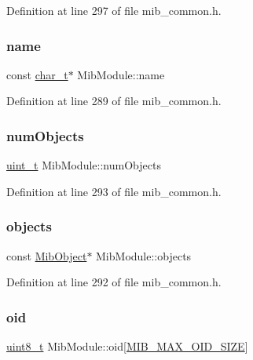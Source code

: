 Definition at line 297 of file mib\+\_\+common.\+h.

\mbox{\label{structMibModule_a2f457893adfb6a6711ac75cbaa55c9b1}} 
\subsubsection{\texorpdfstring{name}{name}}
{\footnotesize\ttfamily const \hyperlink{compiler__port_8h_a40bb5262bf908c328fbcfbe5d29d0201}{char\+\_\+t}$\ast$ Mib\+Module\+::name}



Definition at line 289 of file mib\+\_\+common.\+h.

\mbox{\label{structMibModule_ab9594c4a682ecd9c16c0986307dce4b3}} 
\subsubsection{\texorpdfstring{num\+Objects}{numObjects}}
{\footnotesize\ttfamily \hyperlink{compiler__port_8h_a12a1e9b3ce141648783a82445d02b58d}{uint\+\_\+t} Mib\+Module\+::num\+Objects}



Definition at line 293 of file mib\+\_\+common.\+h.

\mbox{\label{structMibModule_ab77b76e01f954ed88084409a966352aa}} 
\subsubsection{\texorpdfstring{objects}{objects}}
{\footnotesize\ttfamily const \hyperlink{mib__common_8h_a2bc33cee6dd90a0ee8eeb92976a1c479}{Mib\+Object}$\ast$ Mib\+Module\+::objects}



Definition at line 292 of file mib\+\_\+common.\+h.

\mbox{\label{structMibModule_af5a55e711701cdec4f0cb9edc7c2b5a4}} 
\subsubsection{\texorpdfstring{oid}{oid}}
{\footnotesize\ttfamily \hyperlink{stdint_8h_aba7bc1797add20fe3efdf37ced1182c5}{uint8\+\_\+t} Mib\+Module\+::oid\mbox{[}\hyperlink{mib__common_8h_a70ab69e5198d8438346981c7b26dabca}{M\+I\+B\+\_\+\+M\+A\+X\+\_\+\+O\+I\+D\+\_\+\+S\+I\+ZE}\mbox{]}}



